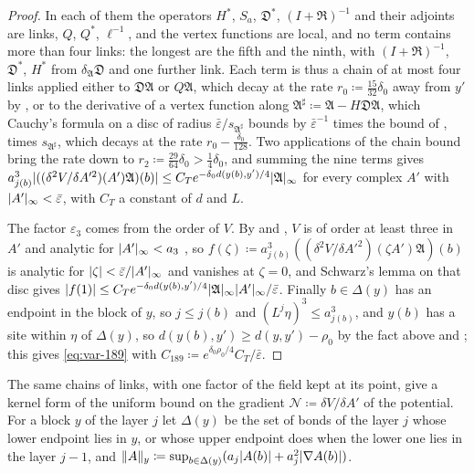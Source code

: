 \documentclass[11pt]{preprint}
\DeclarePairedDelimiter{\abs}{\lvert}{\rvert}
\DeclarePairedDelimiter{\norm}{\lVert}{\rVert}
\numberwithin{equation}{section}
\theoremstyle{definition}
\theoremstyle{remark}
\theoremstyle{plain}
\begin{document}
\begin{proof}
In each of them the operators $H^*$, $S_a$, $\mathfrak D^*$, $(I + \mathfrak R)^{-1}$ and their adjoints are links, $Q$, $Q^*$, $\ell^{-1}$, and the vertex functions are local, and no term contains more than four links: the longest are the fifth and the ninth, with $(I + \mathfrak R)^{-1}$, $\mathfrak D^*$, $H^*$ from $\delta_{\mathfrak A}\mathfrak D$ and one further link. Each term is thus a chain of at most four links applied either to $\mathfrak D\mathfrak A$ or $Q\mathfrak A$, which decay at the rate $r_0 \coloneqq \frac{15}{32}\delta_0$ away from $y'$ by \cite[(73)]{BalabanVAR}, or to the derivative of a vertex function along $\mathfrak A^\sharp \coloneqq \mathfrak A - H\mathfrak D\mathfrak A$, which Cauchy's formula on a disc of radius $\bar\varepsilon/s_{\mathfrak A^\sharp}$ bounds by $\bar\varepsilon^{-1}$ times the bound of \cite[(72)]{BalabanVAR}, times $s_{\mathfrak A^\sharp}$, which decays at the rate $r_0 - \frac{\delta_0}{128}$. Two applications of the chain bound bring the rate down to $r_2 \coloneqq \frac{29}{64}\delta_0 > \frac14\delta_0$, and summing the nine terms gives $a_{j(b)}^3\abs{((\delta^2V/\delta A'^2)(A')\mathfrak A)(b)} \leq C_Te^{-\delta_0d(y(b),y')/4}\abs{\mathfrak A}_\infty$ for every complex $A'$ with $\abs{A'}_\infty < \bar\varepsilon$, with $C_T$ a constant of $d$ and $L$.

The factor $\varepsilon_3$ comes from the order of $V$. By \cite[(55), (56)]{BalabanVAR} and \cite[p.~282, l.~27]{BalabanVAR}, $V$ is of order at least three in $A'$ and analytic for $\abs{A'}_\infty < a_3$ \cite[p.~290, l.~32]{BalabanVAR}, so $f(\zeta) \coloneqq a_{j(b)}^3((\delta^2V/\delta A'^2)(\zeta A')\mathfrak A)(b)$ is analytic for $\abs\zeta < \bar\varepsilon/\abs{A'}_\infty$ and vanishes at $\zeta = 0$, and Schwarz's lemma on that disc gives $\abs{f(1)} \leq C_Te^{-\delta_0d(y(b),y')/4}\abs{\mathfrak A}_\infty\abs{A'}_\infty/\bar\varepsilon$. Finally $b \in \Delta(y)$ has an endpoint in the block of $y$, so $j \leq j(b)$ and $(L^j\eta)^3 \leq a_{j(b)}^3$, and $y(b)$ has a site within $\eta$ of $\Delta(y)$, so $d(y(b), y') \geq d(y, y') - \rho_0$ by the fact above and \cite[(2.54)]{BalabanPRT2}; this gives \eqref{eq:var-189} with $C_{189} \coloneqq e^{\delta_0\rho_0/4}C_T/\bar\varepsilon$.
\end{proof}

The same chains of links, with one factor of the field kept at its point, give a kernel form of the uniform bound \cite[(97)--(98)]{BalabanVAR} on the gradient $\mathcal N \coloneqq \delta V/\delta A'$ of the potential. For a block $y$ of the layer $j$ let $\Delta(y)$ be the set of bonds of the layer $j$ whose lower endpoint lies in $y$, or whose upper endpoint does when the lower one lies in the layer $j - 1$, and $\norm{A}_y \coloneqq \sup_{b \in \Delta(y)}(a_j\abs{A(b)} + a_j^2\abs{\nabla A(b)})$.
\end{document}
